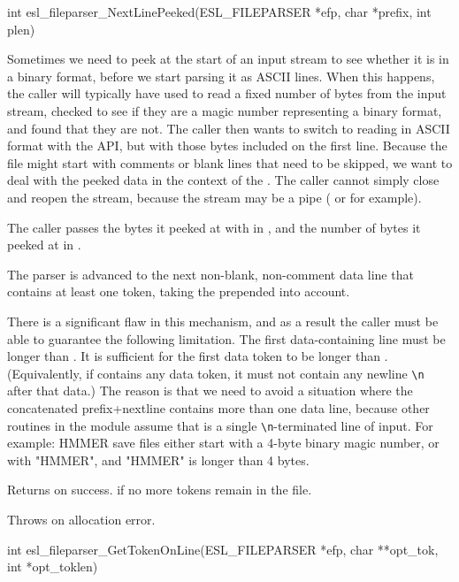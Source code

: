 \begin{sreapi}
\hypertarget{func:esl_fileparser_NextLinePeeked()}
{\item[int esl\_fileparser\_NextLinePeeked(ESL\_FILEPARSER *efp, char *prefix, int plen)]}

Sometimes we need to peek at the start of an input stream
to see whether it is in a binary format, before we start
parsing it as ASCII lines. When this happens, the caller
will typically have used  to read a fixed
number of bytes from the input stream, checked to see if
they are a magic number representing a binary format,
and found that they are not. The caller then wants to
switch to reading in ASCII format with the 
API, but with those bytes included on the first
line. Because the file might start with comments or
blank lines that need to be skipped, we want to deal
with the peeked data in the context of the
. The caller cannot simply close and
reopen the stream, because the stream may be a pipe
( or  for example).

The caller passes the bytes it peeked at with 
in , and the number of bytes it peeked at in
.

The parser is advanced to the next non-blank,
non-comment data line that contains at least one token,
taking the prepended  into account.

There is a significant flaw in this mechanism, and as a
result the caller must be able to guarantee the
following limitation. The first data-containing line
must be longer than . It is sufficient for the
first data token to be longer than .
(Equivalently, if  contains any data token, it
must not contain any newline \verb+\n+ after that data.)  The
reason is that we need to avoid a situation where the
concatenated prefix+nextline contains more than one data
line, because other routines in the module assume that
 is a single \verb+\n+-terminated line of input.  For
example: HMMER save files either start with a 4-byte
binary magic number, or with "HMMER", and "HMMER" is
longer than 4 bytes.

Returns  on success.
 if no more tokens remain in the file.  

Throws  on allocation error.



\hypertarget{func:esl_fileparser_GetTokenOnLine()}
{\item[int esl\_fileparser\_GetTokenOnLine(ESL\_FILEPARSER *efp, char **opt\_tok, int *opt\_toklen)]}


\end{sreapi}
